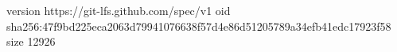 version https://git-lfs.github.com/spec/v1
oid sha256:47f9bd225eca2063d79941076638f57d4e86d51205789a34efb41edc17923f58
size 12926
